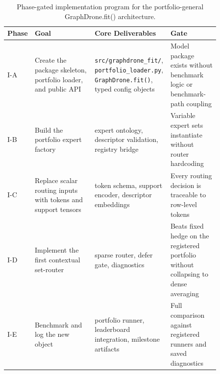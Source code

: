 \begin{table}[h]
\centering
\begin{tabular}{p{0.12\linewidth} p{0.29\linewidth} p{0.22\linewidth} p{0.23\linewidth}}
\hline
Phase & Goal & Core Deliverables & Gate \\
\hline
I-A & Create the package skeleton, portfolio loader, and public API & \texttt{src/graphdrone\_fit/}, \texttt{portfolio\_loader.py}, \texttt{GraphDrone.fit()}, typed config objects & Model package exists without benchmark logic or benchmark-path coupling \\
I-B & Build the portfolio expert factory & expert ontology, descriptor validation, registry bridge & Variable expert sets instantiate without router hardcoding \\
I-C & Replace scalar routing inputs with tokens and support tensors & token schema, support encoder, descriptor embeddings & Every routing decision is traceable to row-level tokens \\
I-D & Implement the first contextual set-router & sparse router, defer gate, diagnostics & Beats fixed hedge on the registered portfolio without collapsing to dense averaging \\
I-E & Benchmark and log the new object & portfolio runner, leaderboard integration, milestone artifacts & Full comparison against registered runners and saved diagnostics \\
\hline
\end{tabular}
\caption{Phase-gated implementation program for the portfolio-general GraphDrone.fit() architecture.}
\end{table}

